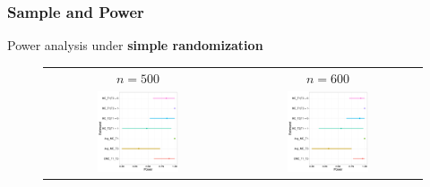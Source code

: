 \documentclass{beamer}\usepackage[]{graphicx}\usepackage[]{color}
\begin{document}
\begin{frame}\frametitle{Sample and Power}
Power analysis under \textbf{simple randomization}
    
\begin{figure}[htbp]
	\centering
\begin{table}
	\begin{tabular}{cc}
	$n=500$	& $n=600$  \\
	\includegraphics[width=0.45\textwidth]{power500}	& \includegraphics[width=0.45\textwidth]{power600}  \\
	\end{tabular}
\end{table}
\end{figure}
    
\end{frame}
\end{document}

